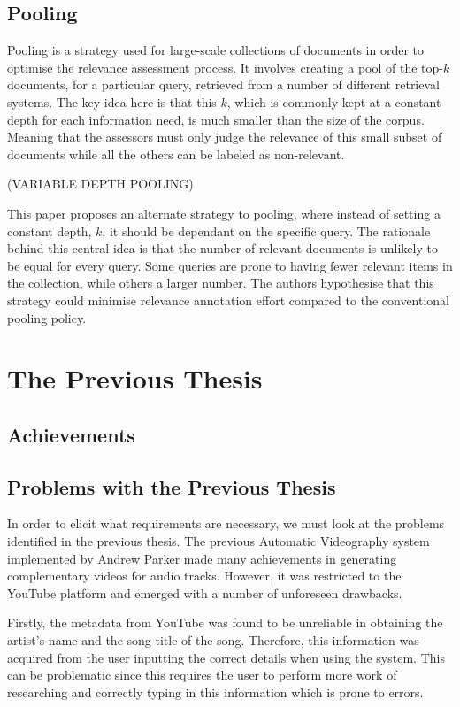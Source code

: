 \documentclass{l4proj}
\begin{document}
\subsection{Pooling}
\label{ssec:pooling}
Pooling is a strategy used for large-scale collections of documents in order to optimise the relevance assessment process. It involves creating a pool of the top-$k$ documents, for a particular query, retrieved from a number of different retrieval systems. The key idea here is that this $k$, which is commonly kept at a constant depth for each information need, is much smaller than the size of the corpus. Meaning that the assessors must only judge the relevance of this small subset of documents while all the others can be labeled as non-relevant. 

(VARIABLE DEPTH POOLING)

This paper proposes an alternate strategy to pooling, where instead of setting a constant depth, $k$, it should be dependant on the specific query. The rationale behind this central idea is that the number of relevant documents is unlikely to be equal for every query. Some queries are prone to having fewer relevant items in the collection, while others a larger number. The authors hypothesise that this strategy could minimise relevance annotation effort compared to the conventional pooling policy.


\section{The Previous Thesis}
\label{sec:background_parker}
\subsection{Achievements}
\subsection{Problems with the Previous Thesis}
In order to elicit what requirements are necessary, we must look at the problems identified in the previous thesis.
The previous Automatic Videography system implemented by Andrew Parker made many achievements in generating complementary videos for audio tracks. However, it was restricted to the YouTube platform and emerged with a number of unforeseen drawbacks. 

Firstly, the metadata from YouTube was found to be unreliable in obtaining the artist's name and the song title of the song. Therefore, this information was acquired from the user inputting the correct details when using the system. This can be problematic since this requires the user to perform more work of researching and correctly typing in this information which is prone to errors. 
\end{document}
